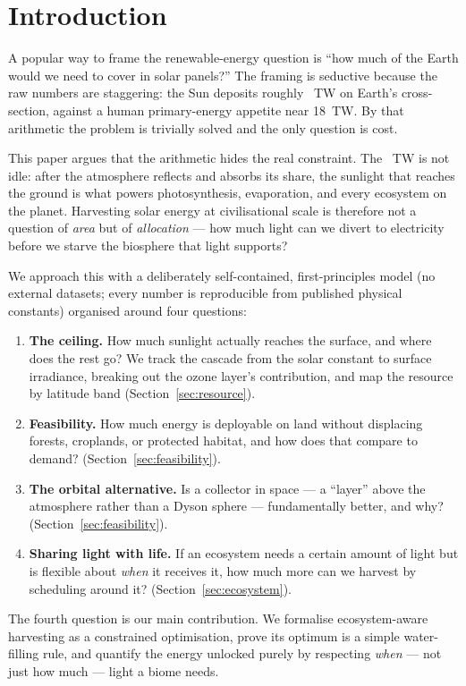 \section{Introduction}

A popular way to frame the renewable-energy question is ``how much of the Earth
would we need to cover in solar panels?'' The framing is seductive because the
raw numbers are staggering: the Sun deposits roughly \InterceptedTW~TW on
Earth's cross-section, against a human primary-energy appetite near 18~TW. By
that arithmetic the problem is trivially solved and the only question is cost.

This paper argues that the arithmetic hides the real constraint. The
\InterceptedTW~TW is not idle: after the atmosphere reflects and absorbs its
share, the sunlight that reaches the ground is what powers photosynthesis,
evaporation, and every ecosystem on the planet. Harvesting solar energy at
civilisational scale is therefore not a question of \emph{area} but of
\emph{allocation} --- how much light can we divert to electricity before we
starve the biosphere that light supports?

We approach this with a deliberately self-contained, first-principles model
(no external datasets; every number is reproducible from published physical
constants) organised around four questions:

\begin{enumerate}
\item \textbf{The ceiling.} How much sunlight actually reaches the surface,
  and where does the rest go? We track the cascade from the solar constant to
  surface irradiance, breaking out the ozone layer's contribution, and map the
  resource by latitude band (Section~\ref{sec:resource}).
\item \textbf{Feasibility.} How much energy is deployable on land without
  displacing forests, croplands, or protected habitat, and how does that
  compare to demand? (Section~\ref{sec:feasibility}).
\item \textbf{The orbital alternative.} Is a collector in space --- a ``layer''
  above the atmosphere rather than a Dyson sphere --- fundamentally better, and
  why? (Section~\ref{sec:feasibility}).
\item \textbf{Sharing light with life.} If an ecosystem needs a certain amount
  of light but is flexible about \emph{when} it receives it, how much more can
  we harvest by scheduling around it? (Section~\ref{sec:ecosystem}).
\end{enumerate}

The fourth question is our main contribution. We formalise ecosystem-aware
harvesting as a constrained optimisation, prove its optimum is a simple
water-filling rule, and quantify the energy unlocked purely by respecting
\emph{when} --- not just how much --- light a biome needs.
